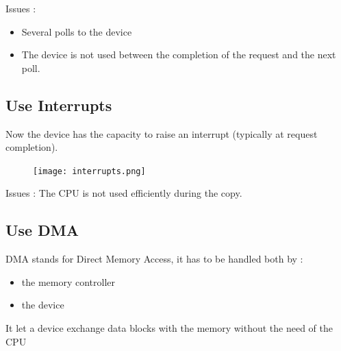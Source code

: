\documentclass[a4paper,10pt]{article}
\begin{document}
Issues :

\begin{itemize}
  \item Several polls to the device
  \item The device is not used between the completion of the request and the next poll.
\end{itemize}

\subsection{Use Interrupts}

Now the device has the capacity to raise an interrupt (typically at request completion).

\begin{figure}[h!]
  \begin{center}
    \texttt{[image: interrupts.png]}
    \label{fig:}
  \end{center}
\end{figure}

Issues : The CPU is not used efficiently during the copy.

\subsection{Use DMA}

DMA stands for Direct Memory Access, it has to be handled both by :
\begin{itemize}
  \item the memory controller
  \item the device
\end{itemize}

It let a device exchange data blocks with the memory without the need of the CPU
\end{document}
